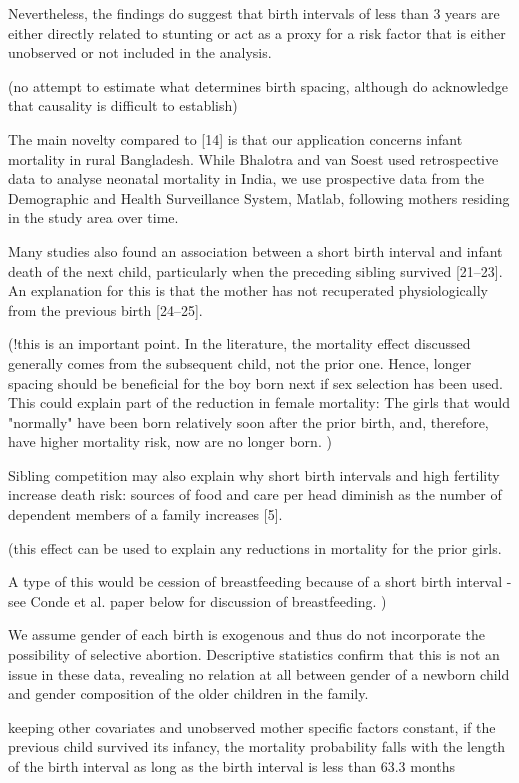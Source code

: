 Nevertheless, the ﬁndings do suggest that birth intervals of less than 3
years are either directly related to stunting or act as a proxy for a
risk factor that is either unobserved or not included in the analysis.

(no attempt to estimate what determines birth spacing, although do acknowledge that
causality is difficult to establish)

\citet{Soest2018}

The main novelty compared to [14] is that our application concerns
infant mortality in rural Bangladesh. While Bhalotra and van Soest used
retrospective data to analyse neonatal mortality in India, we use
prospective data from the Demographic and Health Surveillance System,
Matlab, following mothers residing in the study area over time.


Many studies also found an association between a short birth interval
and infant death of the next child, particularly when the preceding
sibling survived [21–23]. An explanation for this is that the mother has
not recuperated physiologically from the previous birth [24–25].

(!this is an important point. In the literature, the mortality effect discussed
generally comes from the subsequent child, not the prior one. 
Hence, longer spacing should be beneficial for the boy born next if 
sex selection has been used.
This could explain part of the reduction in female mortality: The
girls that would "normally" have been born relatively soon after the
prior birth, and, therefore, have higher mortality risk, now are no
longer born.
)

Sibling competition may also explain why short birth intervals and high
fertility increase death risk: sources of food and care per head
diminish as the number of dependent members of a family increases [5].

(this effect can be used to explain any reductions in mortality for
the prior girls.

A type of this would be cession of breastfeeding because of a short
birth interval - see Conde et al. paper below for discussion of 
breastfeeding. 
)

We assume gender of each birth is exogenous and thus do not incorporate
the possibility of selective abortion. Descriptive statistics confirm
that this is not an issue in these data, revealing no relation at all
between gender of a newborn child and gender composition of the older
children in the family.


keeping other covariates and unobserved mother specific factors
constant, if the previous child survived its infancy, the mortality
probability falls with the length of the birth interval as long as the
birth interval is less than 63.3 months

